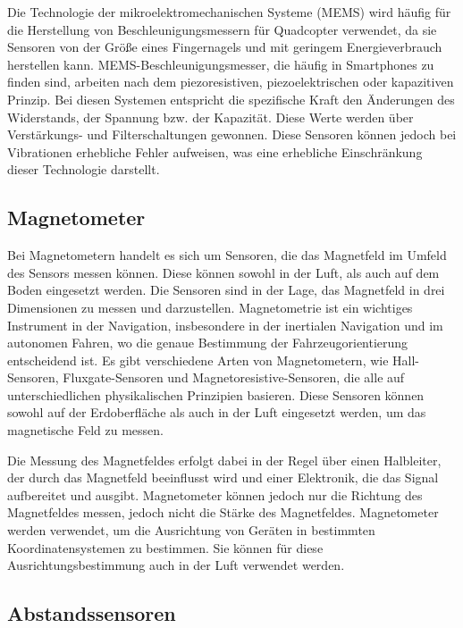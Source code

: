 Die Technologie der mikroelektromechanischen Systeme (MEMS) wird häufig für die Herstellung von Beschleunigungsmessern für Quadcopter verwendet, da sie Sensoren von der Größe eines Fingernagels und mit geringem Energieverbrauch herstellen kann. MEMS-Beschleunigungsmesser, die häufig in Smartphones zu finden sind, arbeiten nach dem piezoresistiven, piezoelektrischen oder kapazitiven Prinzip. Bei diesen Systemen entspricht die spezifische Kraft den Änderungen des Widerstands, der Spannung bzw. der Kapazität. Diese Werte werden über Verstärkungs- und Filterschaltungen gewonnen. Diese Sensoren können jedoch bei Vibrationen erhebliche Fehler aufweisen, was eine erhebliche Einschränkung dieser Technologie darstellt. 

    \cite[vgl.][S. 149-155]{SWB-165930377X}
    \subsection{Magnetometer} \label{magnetometer:subsection}

    Bei Magnetometern handelt es sich um Sensoren, die das Magnetfeld im Umfeld des Sensors messen können.
    Diese können sowohl in der Luft, als auch auf dem Boden eingesetzt werden.
    Die Sensoren sind in der Lage, das Magnetfeld in drei Dimensionen zu messen und darzustellen.
    Magnetometrie ist ein wichtiges Instrument in der Navigation, insbesondere in der inertialen Navigation und im autonomen Fahren, wo die genaue Bestimmung der Fahrzeugorientierung entscheidend ist. Es gibt verschiedene Arten von Magnetometern, wie Hall-Sensoren, Fluxgate-Sensoren und Magnetoresistive-Sensoren, die alle auf unterschiedlichen physikalischen Prinzipien basieren. Diese Sensoren können sowohl auf der Erdoberfläche als auch in der Luft eingesetzt werden, um das magnetische Feld zu messen.

    Die Messung des Magnetfeldes erfolgt dabei in der Regel über einen Halbleiter, der durch das Magnetfeld beeinflusst wird und einer Elektronik, die das Signal aufbereitet und ausgibt.
    Magnetometer können jedoch nur die Richtung des Magnetfeldes messen, jedoch nicht die Stärke des Magnetfeldes.
    Magnetometer werden verwendet, um die Ausrichtung von Geräten in bestimmten Koordinatensystemen zu bestimmen.
    Sie können für diese Ausrichtungsbestimmung auch in der Luft verwendet werden. 

    \cite[vgl.][S. 155]{SWB-165930377X}
 
    \subsection{Abstandssensoren} \label{abstandssensoren:subsection}

